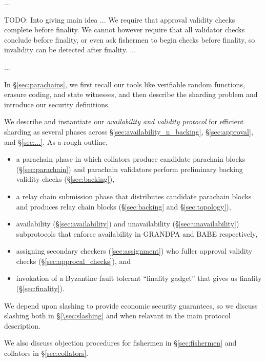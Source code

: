 

...


TODO: Into giving main idea
...
We require that approval validity checks complete before finality.  We cannot however require that all validator checks conclude before finality, or even ask fishermen to begin checks before finality, so invalidity can be detected after finality.
...

...

In \S\ref{sec:parachains}, we first recall our tools like verifiable random functions, erasure coding, and state witnesses, and then describe the sharding problem and introduce our security definitions. 

We describe and instantiate our {\em availability and validity protocol} for efficient sharding as several phases across \S\ref{sec:availability_n_backing}, \S\ref{sec:approval}, and \S\ref{sec:...}.  As a rough outline,
\begin{itemize}
\item a parachain phase in which collators produce candidate parachain blocks (\S\ref{sec:parachain}) and parachain validators perform preliminary backing validity checks (\S\ref{sec:backing}),
\item a relay chain submission phase that distributes candidate parachain blocks and produces relay chain blocks (\S\ref{sec:backing} and \S\ref{sec:topology}),
\item availability (\S\ref{sec:availability}) and unavailability (\S\ref{sec:unavailability}) subprotocols that enforce availability in GRANDPA and BABE respectively,
\item assigning secondary checkers (\ref{sec:assignment}) who fuller approval validity checks (\S\ref{sec:approcal_checks}), and
\item invokation of a Byzantine fault tolerant ``finality gadget'' that gives us finality (\S\ref{sec:finality}).
\end{itemize}
We depend upon slashing to provide economic security guarantees, so we discuss slashing both in \S\ref{\sec:slashing} and when relavant in the main protocol description.

We also discuss objection procedures for fishermen in \S\ref{sec:fishermen} and collators in \S\ref{sec:collators}.

